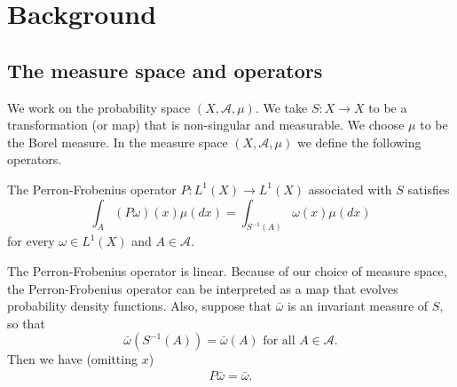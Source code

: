 %
%

\section{Background}
\label{sec:numcutoffbackground}

\subsection{The measure space and operators}

We work on the probability space $(X,\mathcal{A},\mu)$. We take $S: X
\to X$ to be a transformation (or map) that is non-singular and
measurable. We choose $\mu$ to be the Borel measure. In the measure
space $(X,\mathcal{A},\mu)$ we define the following operators.




\begin{definition}
The Perron-Frobenius operator $P:L^1(X) \to L^1(X)$ associated with
$S$ satisfies
\begin{equation}
  \int_A (P \omega)(x)\mu(dx) = \int_{S^{-1}(A)} \omega(x)\mu(dx)
\end{equation}
for every $\omega \in L^1(X)$ and $A \in \mathcal{A}$.
\end{definition}
The Perron-Frobenius operator is linear. Because of our choice of
measure space, the Perron-Frobenius operator can be interpreted as a
map that evolves probability density functions. Also, suppose that
$\bar{\omega}$ is an invariant measure of $S$, so that
\begin{equation}
   \bar{\omega}(S^{-1}(A)) = \bar{\omega}(A)  \text{ for all } A \in \mathcal{A}.
\end{equation}
Then we have (omitting $x$)
\begin{eqnarray}
  P \bar{\omega} = \bar{\omega}.
\end{eqnarray}

